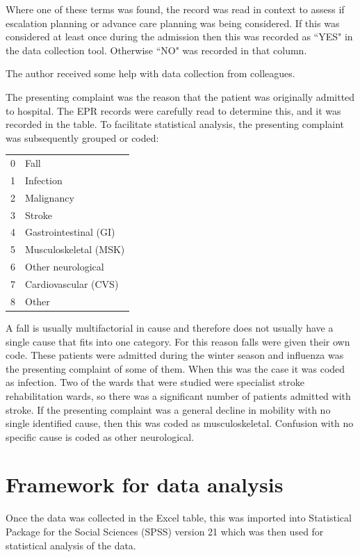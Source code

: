 \documentclass
[
	12pt,
	a4paper,
	oneside,
]{report}
\begin{document}
Where one of these terms was found, the record was read in context to assess if 
escalation planning or advance care planning was being considered. If this
was considered at least once during the admission then this was recorded as 
``YES"
in the data collection tool. Otherwise ``NO" was recorded in that column.

The author received some help with data collection from colleagues.

The presenting complaint was the reason that the patient was originally 
admitted to hospital. The EPR records were carefully read to determine this,
and it was recorded in the table. To facilitate statistical analysis, the 
presenting complaint was subsequently grouped or coded:

\begin{tabular}{ r l }
0 & Fall \\
1 & Infection \\
2 & Malignancy \\
3 & Stroke \\
4 & Gastrointestinal (GI) \\
5 & Musculoskeletal (MSK) \\
6 & Other neurological \\
7 & Cardiovascular (CVS) \\
8 & Other \\
\end{tabular}

A fall is usually multifactorial in cause \parencite{silver:12} and therefore
does not usually have a single cause that fits into one category. For this 
reason falls were given their own code.
These patients were admitted during the winter season and influenza was the
presenting complaint of some of them. When this was the case it was coded as
infection. Two of the wards that were studied were specialist stroke 
rehabilitation wards, so there was a significant number of patients admitted
with stroke. If the presenting complaint was a general decline in mobility 
with no single identified cause, then this was coded as musculoskeletal.
Confusion with no specific cause is coded as other neurological.

\section{Framework for data analysis}

Once the data was collected in the Excel table, this was imported into 
Statistical Package for the Social Sciences (SPSS) version 21 which was then
used for statistical analysis of the data.
\end{document}

